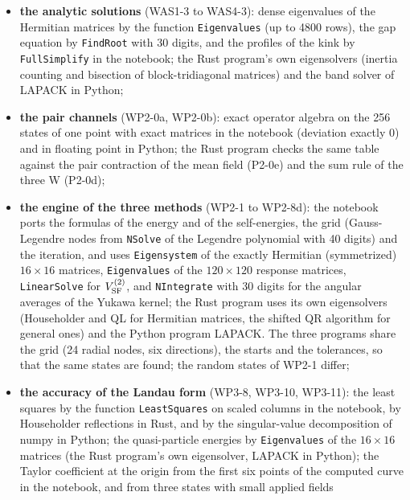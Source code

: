 \documentclass[
  10pt,
]{article}
\begin{document}
\begin{itemize}
  symbolic couplings, in the notebook (the characteristic polynomial and
  the null vector of the mass matrix); the four eigenvectors with 20
  values of the couplings in Rust; the eigenvalues by LAPACK with 20
  random values in Python;
\item
  \textbf{the analytic solutions} (WAS1-3 to WAS4-3): dense eigenvalues
  of the Hermitian matrices by the function \texttt{Eigenvalues} (up to
  4800 rows), the gap equation by \texttt{FindRoot} with 30 digits, and
  the profiles of the kink by \texttt{FullSimplify} in the notebook; the
  Rust program's own eigensolvers (inertia counting and bisection of
  block-tridiagonal matrices) and the band solver of LAPACK in Python;
\item
  \textbf{the pair channels} (WP2-0a, WP2-0b): exact operator algebra on
  the 256 states of one point with exact matrices in the notebook
  (deviation exactly 0) and in floating point in Python; the Rust
  program checks the same table against the pair contraction of the mean
  field (P2-0e) and the sum rule of the three W (P2-0d);
\item
  \textbf{the engine of the three methods} (WP2-1 to WP2-8d): the
  notebook ports the formulas of the energy and of the self-energies,
  the grid (Gauss-Legendre nodes from \texttt{NSolve} of the Legendre
  polynomial with 40 digits) and the iteration, and uses
  \texttt{Eigensystem} of the exactly Hermitian (symmetrized)
  \(16\times16\) matrices, \texttt{Eigenvalues} of the \(120\times120\)
  response matrices, \texttt{LinearSolve} for \(V^{(2)}_{\rm SF}\), and
  \texttt{NIntegrate} with 30 digits for the angular averages of the
  Yukawa kernel; the Rust program uses its own eigensolvers (Householder
  and QL for Hermitian matrices, the shifted QR algorithm for general
  ones) and the Python program LAPACK. The three programs share the grid
  (24 radial nodes, six directions), the starts and the tolerances, so
  that the same states are found; the random states of WP2-1 differ;
\item
  \textbf{the accuracy of the Landau form} (WP3-8, WP3-10, WP3-11): the
  least squares by the function \texttt{LeastSquares} on scaled columns
  in the notebook, by Householder reflections in Rust, and by the
  singular-value decomposition of numpy in Python; the quasi-particle
  energies by \texttt{Eigenvalues} of the \(16\times16\) matrices (the
  Rust program's own eigensolver, LAPACK in Python); the Taylor
  coefficient at the origin from the first six points of the computed
  curve in the notebook, and from three states with small applied fields

\end{itemize}
\end{document}

